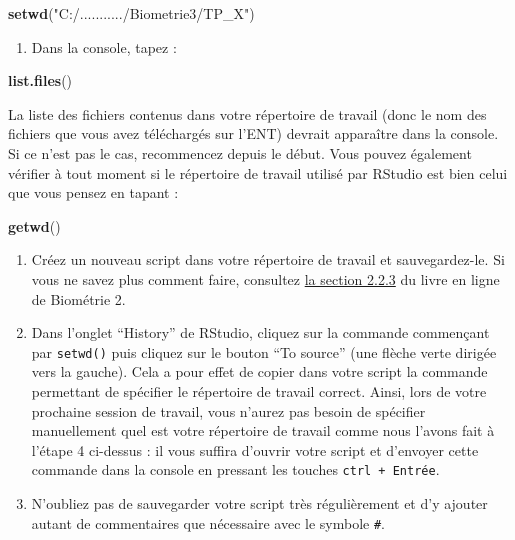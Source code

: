 \documentclass[a4paperpaper,]{article}
\newenvironment{Shaded}{\begin{snugshade}}{\end{snugshade}}
\newcommand{\KeywordTok}[1]{\textcolor[rgb]{0.12,0.11,0.11}{\textbf{#1}}}
\newcommand{\NormalTok}[1]{\textcolor[rgb]{0.12,0.11,0.11}{#1}}
\newcommand{\StringTok}[1]{\textcolor[rgb]{0.75,0.01,0.01}{#1}}
\providecommand{\tightlist}{%
  \setlength{\itemsep}{0pt}\setlength{\parskip}{0pt}}
\begin{document}
\begin{Shaded}
\begin{Highlighting}[]
\KeywordTok{setwd}\NormalTok{(}\StringTok{"C:/.........../Biometrie3/TP_X"}\NormalTok{)}
\end{Highlighting}
\end{Shaded}

\begin{enumerate}
\def\labelenumi{\arabic{enumi}.}
\setcounter{enumi}{4}
\tightlist
\item
  Dans la console, tapez :
\end{enumerate}

\begin{Shaded}
\begin{Highlighting}[]
\KeywordTok{list.files}\NormalTok{()}
\end{Highlighting}
\end{Shaded}

La liste des fichiers contenus dans votre répertoire de travail (donc le nom des fichiers que vous avez téléchargés sur l'ENT) devrait apparaître dans la console. Si ce n'est pas le cas, recommencez depuis le début. Vous pouvez également vérifier à tout moment si le répertoire de travail utilisé par RStudio est bien celui que vous pensez en tapant :

\begin{Shaded}
\begin{Highlighting}[]
\KeywordTok{getwd}\NormalTok{()}
\end{Highlighting}
\end{Shaded}

\begin{enumerate}
\def\labelenumi{\arabic{enumi}.}
\setcounter{enumi}{5}
\tightlist
\item
  Créez un nouveau script dans votre répertoire de travail et sauvegardez-le. Si vous ne savez plus comment faire, consultez \href{https://besibo.github.io/Biometrie2/bases.html\#les-scripts}{la section 2.2.3} du livre en ligne de Biométrie 2.
\item
  Dans l'onglet ``History'' de RStudio, cliquez sur la commande commençant par \texttt{setwd()} puis cliquez sur le bouton ``To source'' (une flèche verte dirigée vers la gauche). Cela a pour effet de copier dans votre script la commande permettant de spécifier le répertoire de travail correct. Ainsi, lors de votre prochaine session de travail, vous n'aurez pas besoin de spécifier manuellement quel est votre répertoire de travail comme nous l'avons fait à l'étape 4 ci-dessus : il vous suffira d'ouvrir votre script et d'envoyer cette commande dans la console en pressant les touches \texttt{ctrl\ +\ Entrée}.
\item
  N'oubliez pas de sauvegarder votre script très régulièrement et d'y ajouter autant de commentaires que nécessaire avec le symbole \texttt{\#}.
\end{enumerate}
\end{document}
